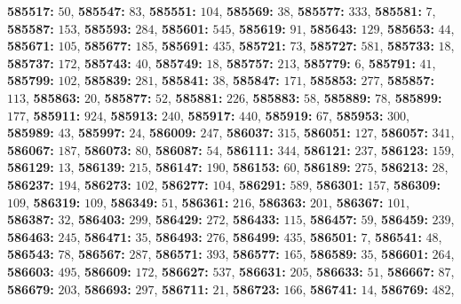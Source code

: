 \textsf{\bfseries 585517:} $50$, \textsf{\bfseries 585547:} $83$, \textsf{\bfseries 585551:} $104$, \textsf{\bfseries 585569:} $38$, \textsf{\bfseries 585577:} $333$, \textsf{\bfseries 585581:} $7$, \textsf{\bfseries 585587:} $153$, \textsf{\bfseries 585593:} $284$, \textsf{\bfseries 585601:} $545$, \textsf{\bfseries 585619:} $91$, \textsf{\bfseries 585643:} $129$, \textsf{\bfseries 585653:} $44$, \textsf{\bfseries 585671:} $105$, \textsf{\bfseries 585677:} $185$, \textsf{\bfseries 585691:} $435$, \textsf{\bfseries 585721:} $73$, \textsf{\bfseries 585727:} $581$, \textsf{\bfseries 585733:} $18$, \textsf{\bfseries 585737:} $172$, \textsf{\bfseries 585743:} $40$, \textsf{\bfseries 585749:} $18$, \textsf{\bfseries 585757:} $213$, \textsf{\bfseries 585779:} $6$, \textsf{\bfseries 585791:} $41$, \textsf{\bfseries 585799:} $102$, \textsf{\bfseries 585839:} $281$, \textsf{\bfseries 585841:} $38$, \textsf{\bfseries 585847:} $171$, \textsf{\bfseries 585853:} $277$, \textsf{\bfseries 585857:} $113$, \textsf{\bfseries 585863:} $20$, \textsf{\bfseries 585877:} $52$, \textsf{\bfseries 585881:} $226$, \textsf{\bfseries 585883:} $58$, \textsf{\bfseries 585889:} $78$, \textsf{\bfseries 585899:} $177$, \textsf{\bfseries 585911:} $924$, \textsf{\bfseries 585913:} $240$, \textsf{\bfseries 585917:} $440$, \textsf{\bfseries 585919:} $67$, \textsf{\bfseries 585953:} $300$, \textsf{\bfseries 585989:} $43$, \textsf{\bfseries 585997:} $24$, \textsf{\bfseries 586009:} $247$, \textsf{\bfseries 586037:} $315$, \textsf{\bfseries 586051:} $127$, \textsf{\bfseries 586057:} $341$, \textsf{\bfseries 586067:} $187$, \textsf{\bfseries 586073:} $80$, \textsf{\bfseries 586087:} $54$, \textsf{\bfseries 586111:} $344$, \textsf{\bfseries 586121:} $237$, \textsf{\bfseries 586123:} $159$, \textsf{\bfseries 586129:} $13$, \textsf{\bfseries 586139:} $215$, \textsf{\bfseries 586147:} $190$, \textsf{\bfseries 586153:} $60$, \textsf{\bfseries 586189:} $275$, \textsf{\bfseries 586213:} $28$, \textsf{\bfseries 586237:} $194$, \textsf{\bfseries 586273:} $102$, \textsf{\bfseries 586277:} $104$, \textsf{\bfseries 586291:} $589$, \textsf{\bfseries 586301:} $157$, \textsf{\bfseries 586309:} $109$, \textsf{\bfseries 586319:} $109$, \textsf{\bfseries 586349:} $51$, \textsf{\bfseries 586361:} $216$, \textsf{\bfseries 586363:} $201$, \textsf{\bfseries 586367:} $101$, \textsf{\bfseries 586387:} $32$, \textsf{\bfseries 586403:} $299$, \textsf{\bfseries 586429:} $272$, \textsf{\bfseries 586433:} $115$, \textsf{\bfseries 586457:} $59$, \textsf{\bfseries 586459:} $239$, \textsf{\bfseries 586463:} $245$, \textsf{\bfseries 586471:} $35$, \textsf{\bfseries 586493:} $276$, \textsf{\bfseries 586499:} $435$, \textsf{\bfseries 586501:} $7$, \textsf{\bfseries 586541:} $48$, \textsf{\bfseries 586543:} $78$, \textsf{\bfseries 586567:} $287$, \textsf{\bfseries 586571:} $393$, \textsf{\bfseries 586577:} $165$, \textsf{\bfseries 586589:} $35$, \textsf{\bfseries 586601:} $264$, \textsf{\bfseries 586603:} $495$, \textsf{\bfseries 586609:} $172$, \textsf{\bfseries 586627:} $537$, \textsf{\bfseries 586631:} $205$, \textsf{\bfseries 586633:} $51$, \textsf{\bfseries 586667:} $87$, \textsf{\bfseries 586679:} $203$, \textsf{\bfseries 586693:} $297$, \textsf{\bfseries 586711:} $21$, \textsf{\bfseries 586723:} $166$, \textsf{\bfseries 586741:} $14$, \textsf{\bfseries 586769:} $482$, 

